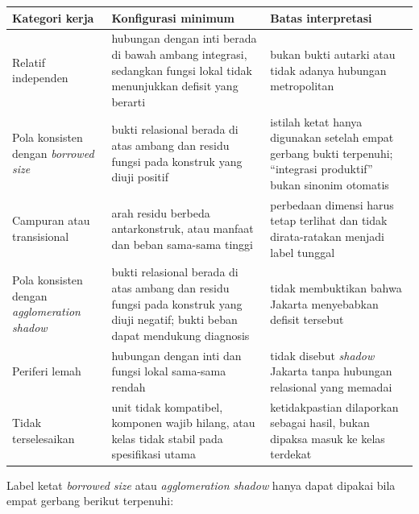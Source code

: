 \documentclass[11pt,a4paper,oneside,openany,indonesian]{report}
\begin{document}
{\def\LTcaptype{none} %
\begin{longtable}[]{@{}
  >{\raggedright\arraybackslash}p{}
  >{\raggedright\arraybackslash}p{}
  >{\raggedright\arraybackslash}p{}@{}}
\toprule\noalign{}
\begin{minipage}[b]{\linewidth}\raggedright
Kategori kerja
\end{minipage} & \begin{minipage}[b]{\linewidth}\raggedright
Konfigurasi minimum
\end{minipage} & \begin{minipage}[b]{\linewidth}\raggedright
Batas interpretasi
\end{minipage} \\
\midrule\noalign{}
\endhead
\bottomrule\noalign{}
\endlastfoot
Relatif independen & hubungan dengan inti berada di bawah ambang
integrasi, sedangkan fungsi lokal tidak menunjukkan defisit yang berarti
& bukan bukti autarki atau tidak adanya hubungan metropolitan \\
Pola konsisten dengan \emph{borrowed size} & bukti relasional berada di
atas ambang dan residu fungsi pada konstruk yang diuji positif &
istilah ketat hanya digunakan setelah empat gerbang bukti terpenuhi;
``integrasi produktif'' bukan sinonim otomatis \\
Campuran atau transisional & arah residu berbeda antarkonstruk, atau
manfaat dan beban sama-sama tinggi & perbedaan dimensi harus tetap
terlihat dan tidak dirata-ratakan menjadi label tunggal \\
Pola konsisten dengan \emph{agglomeration shadow} & bukti relasional
berada di atas ambang dan residu fungsi pada konstruk yang diuji
negatif; bukti beban dapat mendukung diagnosis & tidak membuktikan
bahwa Jakarta menyebabkan defisit tersebut \\
Periferi lemah & hubungan dengan inti dan fungsi lokal sama-sama rendah
& tidak disebut \emph{shadow} Jakarta tanpa hubungan relasional yang
memadai \\
Tidak terselesaikan & unit tidak kompatibel, komponen wajib hilang, atau
kelas tidak stabil pada spesifikasi utama & ketidakpastian dilaporkan
sebagai hasil, bukan dipaksa masuk ke kelas terdekat \\
\end{longtable}
}

Label ketat \emph{borrowed size} atau \emph{agglomeration shadow} hanya
dapat dipakai bila empat gerbang berikut terpenuhi:
\end{document}
